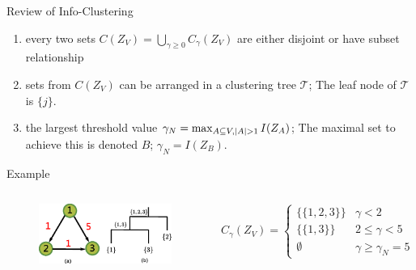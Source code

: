 \documentclass[notheorems]{beamer}
\begin{document}
\begin{frame}{Review of Info-Clustering}
\begin{enumerate}
\item  every two sets $C(Z_V)=\bigcup_{\gamma \geq 0} C_{\gamma}(Z_V)$ are either disjoint or have subset relationship
\item sets from $C(Z_V)$ can be arranged in a clustering tree $\mathcal{T}$; The leaf node of $\mathcal{T}$ is $\{j\}$.
\item the largest threshold value $\gamma_N = \max_{A\subseteq V, \lvert A\rvert>1} I(Z_A)$; The maximal set to achieve this is denoted $B$; $\gamma_N = I(Z_B)$.
\end{enumerate}
Example
\begin{columns}
\begin{figure}
		\includegraphics[width=4.5cm]{pic/example_directed.eps}
\end{figure}
	\begin{equation*}
	C_{\gamma}(Z_V)	=\begin{cases}
					\{\{1,2,3\}\} & \gamma < 2 \\
					\{\{1,3\}\} & 2\leq \gamma < 5 \\
					\emptyset & \gamma \geq \gamma_N = 5
		\end{cases}
	\end{equation*}
\end{columns}
\end{frame}
\end{document}
